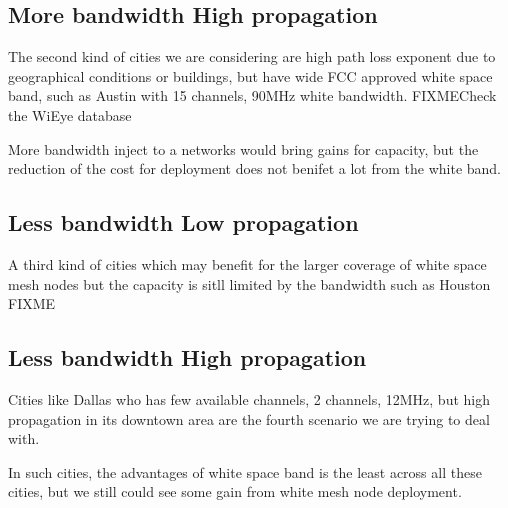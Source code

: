 \subsection{More bandwidth High propagation}
The second kind of cities we are considering are high path loss exponent due to geographical conditions or buildings, but have wide FCC approved white space band, such as Austin with 15 channels, 90MHz white bandwidth. FIXME{Check the WiEye database}

More bandwidth inject to a networks would bring gains for capacity, but the reduction of the cost for deployment does not benifet a lot from the white band.

\subsection{Less bandwidth Low propagation}
A third kind of cities which may benefit for the larger coverage of white space mesh nodes but the capacity is sitll limited by the bandwidth such as Houston FIXME



\subsection{Less bandwidth High propagation}
Cities like Dallas who has few available channels, 2 channels, 12MHz, but high propagation in its downtown area are the fourth scenario we are trying to deal with.

In such cities, the advantages of white space band is the least across all these cities, but we still could see some gain from white mesh node deployment.




